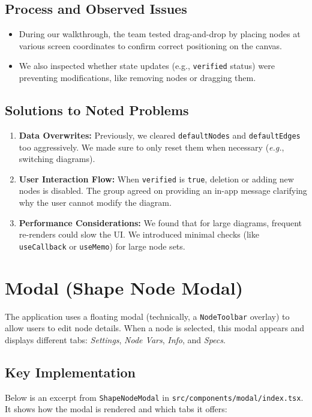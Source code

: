 \documentclass{article}
\begin{document}
\subsection{Process and Observed Issues}
\begin{itemize}
  \item During our walkthrough, the team tested drag-and-drop by placing nodes at various screen coordinates to confirm correct positioning on the canvas.
  \item We also inspected whether state updates (e.g., \texttt{verified} status) were preventing modifications, like removing nodes or dragging them.
\end{itemize}

\subsection{Solutions to Noted Problems}
\begin{enumerate}
  \item \textbf{Data Overwrites:} Previously, we cleared \texttt{defaultNodes} and \texttt{defaultEdges} too aggressively. We made sure to only reset them when necessary (\emph{e.g.}, switching diagrams).
  \item \textbf{User Interaction Flow:} When \texttt{verified} is \texttt{true}, deletion or adding new nodes is disabled. The group agreed on providing an in-app message clarifying why the user cannot modify the diagram.
  \item \textbf{Performance Considerations:} We found that for large diagrams, frequent re-renders could slow the UI. We introduced minimal checks (like \texttt{useCallback} or \texttt{useMemo}) for large node sets.
\end{enumerate}


\section{Modal (Shape Node Modal)}

The application uses a floating modal (technically, a \texttt{NodeToolbar} overlay) to allow users to edit node details. When a node is selected, this modal appears and displays different tabs: \emph{Settings}, \emph{Node Vars}, \emph{Info}, and \emph{Specs}.

\subsection{Key Implementation}
Below is an excerpt from \texttt{ShapeNodeModal} in \texttt{src/components/modal/index.tsx}. It shows how the modal is rendered and which tabs it offers:
\end{document}
